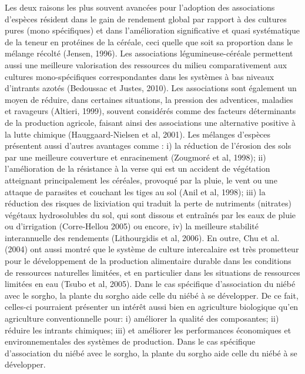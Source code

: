 \documentclass[a4paper,11pt]{article}
\begin{document}
Les deux raisons les plus souvent avancées pour l’adoption des
associations d’espèces résident dans le gain de rendement global par
rapport à des cultures pures (mono spécifiques) et dans l’amélioration
significative et quasi systématique de la teneur en protéines de la
céréale, ceci quelle que soit sa proportion dans le mélange récolté
(Jensen, 1996). Les associations légumineuse-céréale permettent aussi
une meilleure valorisation des ressources du milieu comparativement
aux cultures mono-spécifiques correspondantes dans les systèmes à bas
niveaux d’intrants azotés (Bedoussac et Justes, 2010). Les
associations sont également un moyen de réduire, dans certaines
situations, la pression des adventices, maladies et ravageurs
(Altieri, 1999), souvent considérés comme des facteurs déterminants de
la production agricole, faisant ainsi des associations une alternative
positive à la lutte chimique (Hauggaard-Nielsen et al, 2001). Les
mélanges d’espèces présentent aussi d’autres avantages comme : i) la
réduction de l’érosion des sols par une meilleure couverture et
enracinement (Zougmoré et al, 1998); ii) l’amélioration de la
résistance à la verse qui est un accident de végétation atteignant
principalement les céréales, provoqué par la pluie, le vent ou une
attaque de parasites et couchant les tiges au sol (Anil et al, 1998);
iii) la réduction des risques de lixiviation qui traduit la perte de
nutriments (nitrates) végétaux hydrosolubles du sol, qui sont dissous
et entraînés par les eaux de pluie ou d’irrigation (Corre-Hellou 2005)
ou encore, iv) la meilleure stabilité interannuelle des rendements
(Lithourgidis et al, 2006). En outre, Chu et al. (2004) ont aussi
montré que le système de culture intercalaire est très prometteur pour
le développement de la production alimentaire durable dans les
conditions de ressources naturelles limitées, et en particulier dans
les situations de ressources limitées en eau (Tsubo et al, 2005)\cite{Tsubo_2005}. Dans
le cas spécifique d’association du niébé avec le sorgho, la plante du
sorgho aide celle du niébé à se développer. De ce fait, celles-ci
pourraient présenter un intérêt aussi bien en agriculture biologique
qu’en agriculture conventionnelle pour: i) améliorer la qualité des
composantes; ii) réduire les intrants chimiques; iii) et améliorer les
performances économiques et environnementales des systèmes de
production\cite{Koulibi_FideleZONGO}. Dans le cas spécifique
d'association du niébé avec le sorgho, la plante du sorgho aide celle
du niébé à se développer.

\end{document}
